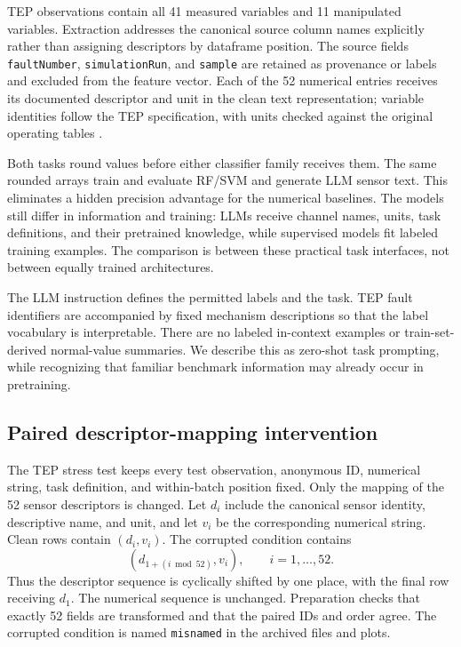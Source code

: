 \documentclass[11pt,a4paper]{article}
\begin{document}
TEP observations contain all 41 measured variables and 11 manipulated variables. Extraction addresses the canonical source column names explicitly rather than assigning descriptors by dataframe position. The source fields \texttt{faultNumber}, \texttt{simulationRun}, and \texttt{sample} are retained as provenance or labels and excluded from the feature vector. Each of the 52 numerical entries receives its documented descriptor and unit in the clean text representation; variable identities follow the TEP specification, with units checked against the original operating tables \citep{chen2014cognitive,ricker1995optimal}.

Both tasks round values before either classifier family receives them. The same rounded arrays train and evaluate RF/SVM and generate LLM sensor text. This eliminates a hidden precision advantage for the numerical baselines. The models still differ in information and training: LLMs receive channel names, units, task definitions, and their pretrained knowledge, while supervised models fit labeled training examples. The comparison is between these practical task interfaces, not between equally trained architectures.

The LLM instruction defines the permitted labels and the task. TEP fault identifiers are accompanied by fixed mechanism descriptions so that the label vocabulary is interpretable. There are no labeled in-context examples or train-set-derived normal-value summaries. We describe this as zero-shot task prompting, while recognizing that familiar benchmark information may already occur in pretraining.

\subsection{Paired descriptor-mapping intervention}
The TEP stress test keeps every test observation, anonymous ID, numerical string, task definition, and within-batch position fixed. Only the mapping of the 52 sensor descriptors is changed. Let $d_i$ include the canonical sensor identity, descriptive name, and unit, and let $v_i$ be the corresponding numerical string. Clean rows contain $(d_i,v_i)$. The corrupted condition contains
\begin{equation}
  (d_{1+(i\bmod 52)},v_i),\qquad i=1,\ldots,52.
\end{equation}
Thus the descriptor sequence is cyclically shifted by one place, with the final row receiving $d_1$. The numerical sequence is unchanged. Preparation checks that exactly 52 fields are transformed and that the paired IDs and order agree. The corrupted condition is named \texttt{misnamed} in the archived files and plots.
\end{document}
